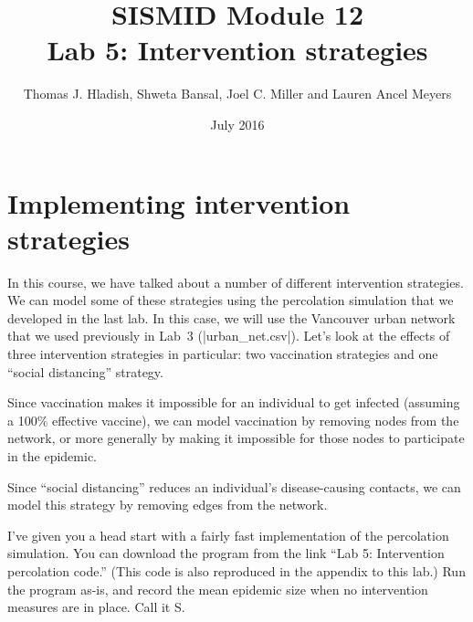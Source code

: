 \documentclass{article}
\begin{document}
\title{SISMID Module 12\\Lab 5: Intervention strategies}
\author{Thomas J. Hladish, Shweta Bansal, Joel C. Miller and Lauren Ancel Meyers}
\date{July 2016}
\maketitle


\section*{Implementing intervention strategies}

In this course, we have talked about a number of different intervention strategies. We can model some of these 
strategies using the percolation simulation that we developed in the last lab.  In this case, we will use
the Vancouver urban network that we used previously in Lab~3 (|urban_net.csv|).  Let's look at the effects of
three intervention strategies in particular: two vaccination strategies and one ``social distancing'' strategy.

Since vaccination makes it impossible for an individual to get infected (assuming a 100\% effective vaccine), we can
model vaccination by removing nodes from the network, or more generally by making it impossible for those nodes to participate in the epidemic.

Since ``social distancing'' reduces an individual's disease-causing contacts, we can model this strategy by
removing edges from the network.

I've given you a head start with a fairly fast implementation of the percolation simulation.  You can download the program 
from the link ``Lab 5: Intervention percolation code.''  (This code is also reproduced in the appendix to this lab.)  Run the program as-is,
and record the mean epidemic size when no intervention measures are in place.  Call it S.
\end{document}
